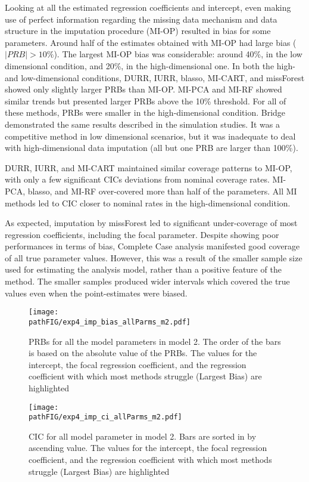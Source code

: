 	Looking at all the estimated regression coefficients and intercept, even making use of perfect information regarding 
	the missing data mechanism and data structure in the imputation procedure (MI-OP) resulted in bias for some parameters.
	Around half of the estimates obtained with MI-OP had large bias ($|PRB|>10\%$).
	The largest MI-OP bias was considerable: around 40\%, in the low dimensional condition, and 20\%, in the 
	high-dimensional one.
	In both the high- and low-dimensional conditions, DURR, IURR, blasso, MI-CART, and
	missForest showed only slightly larger PRBs than MI-OP.
	MI-PCA and MI-RF showed similar trends but presented larger PRBs above the 10\% threshold.
	For all of these methods, PRBs were smaller in the high-dimensional condition.
	Bridge demonstrated the same results described in the simulation studies. 
	It was a competitive method in low dimensional scenarios, but it was inadequate to deal with high-dimensional 
	data imputation (all but one PRB are larger than 100\%).

	DURR, IURR, and MI-CART maintained similar coverage patterns to MI-OP, with only 
	a few significant CICs deviations from nominal coverage rates.
	MI-PCA, blasso, and MI-RF over-covered more than half of the parameters.
	All MI methods led to CIC closer to nominal rates in the high-dimensional condition.
	
	As expected, imputation by missForest led to significant under-coverage of most regression coefficients, 
	including the focal parameter. 
	Despite showing poor performances in terms of bias, Complete Case analysis manifested good 
	coverage of all true parameter values.
	However, this was a result of the smaller sample size used for estimating the analysis model, rather than 
	a positive feature of the method.
	The smaller samples produced wider intervals which covered the true values even when the point-estimates 
	were biased.

\begin{figure}
	\centering
	\texttt{[image: \\pathFIG/exp4\_imp\_bias\_allParms\_m2.pdf]}
	\caption{PRBs for all the model parameters in model 2. 
		The order of the bars is based on the absolute value of the PRBs.
		The values for the intercept, the focal regression coefficient, and the regression coefficient with which most 
		methods struggle (Largest Bias) are highlighted}
	\label{fig:exp4_bias_allP}
\end{figure}

\begin{figure}
	\centering
	\texttt{[image: \\pathFIG/exp4\_imp\_ci\_allParms\_m2.pdf]}
	\caption{CIC for all model parameter in model 2.
		Bars are sorted in by ascending value.
		The values for the intercept, the focal regression coefficient, and the regression coefficient with which most 
		methods struggle (Largest Bias) are highlighted}
	\label{fig:exp4_ci_allP}
\end{figure}

